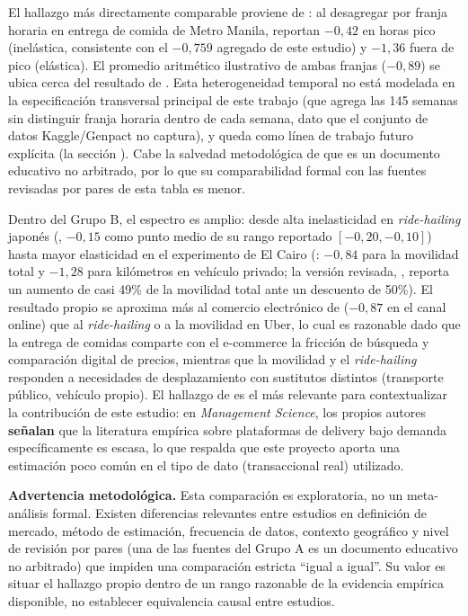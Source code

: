 \documentclass[doc, a4paper, biblatex, floatsintext, longtable, babel]{apa7}
\begin{document}
El hallazgo m\'as directamente comparable proviene de \textcite{bumagat2025economics}: al desagregar por franja horaria en entrega de comida de Metro Manila, reportan $-0,42$ en horas pico (inel\'astica, consistente con el $-0,759$ agregado de este estudio) y $-1,36$ fuera de pico (el\'astica). El promedio aritmético ilustrativo de ambas franjas ($-0,89$) se ubica cerca del resultado de \textcite{damayanti2023}. Esta heterogeneidad temporal no est\'a modelada en la especificaci\'on transversal principal de este trabajo (que agrega las 145 semanas sin distinguir franja horaria dentro de cada semana, dato que el conjunto de datos Kaggle/Genpact no captura), y queda como l\'inea de trabajo futuro expl\'icita (la secci\'on ). Cabe la salvedad metodol\'ogica de que \textcite{bumagat2025economics} es un documento educativo no arbitrado, por lo que su comparabilidad formal con las fuentes revisadas por pares de esta tabla es menor.

Dentro del Grupo B, el espectro es amplio: desde alta inelasticidad en \textit{ride-hailing} japon\'es (\textcite{sriwongphanawes2024}, $-0,15$ como punto medio de su rango reportado $[-0,20, -0,10]$) hasta mayor elasticidad en el experimento de El Cairo (\textcite{christensen2021}: $-0,84$ para la movilidad total y $-1,28$ para kil\'ometros en veh\'iculo privado; la versión revisada, \textcite{christensen2023}, reporta un aumento de casi 49\% de la movilidad total ante un descuento de 50\%). El resultado propio se aproxima m\'as al comercio electr\'onico de \textcite{zhang2021} ($-0,87$ en el canal online) que al \textit{ride-hailing} o a la movilidad en Uber, lo cual es razonable dado que la entrega de comidas comparte con el e-commerce la fricci\'on de b\'usqueda y comparaci\'on digital de precios, mientras que la movilidad y el \textit{ride-hailing} responden a necesidades de desplazamiento con sustitutos distintos (transporte p\'ublico, veh\'iculo propio). El hallazgo de \textcite{li2025} es el m\'as relevante para contextualizar la contribuci\'on de este estudio: en \textit{Management Science}, los propios autores \textbf{se\~nalan} que la literatura emp\'irica sobre plataformas de delivery bajo demanda espec\'ificamente es escasa, lo que respalda que este proyecto aporta una estimaci\'on poco com\'un en el tipo de dato (transaccional real) utilizado.

\textbf{Advertencia metodol\'ogica.} Esta comparaci\'on es exploratoria, no un meta-an\'alisis formal. Existen diferencias relevantes entre estudios en definici\'on de mercado, m\'etodo de estimaci\'on, frecuencia de datos, contexto geogr\'afico y nivel de revisi\'on por pares (una de las fuentes del Grupo A es un documento educativo no arbitrado) que impiden una comparaci\'on estricta ``igual a igual''. Su valor es situar el hallazgo propio dentro de un rango razonable de la evidencia emp\'irica disponible, no establecer equivalencia causal entre estudios.
\end{document}
